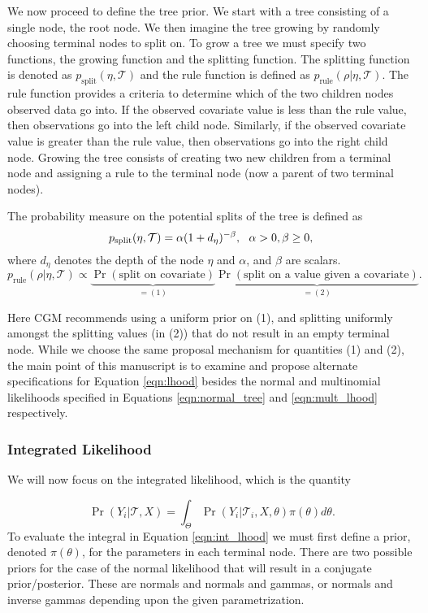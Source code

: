 \documentclass{article}
\begin{document}
We now proceed to define the tree prior. We start with a tree consisting of a single node, the root node. We then imagine the tree growing by randomly choosing terminal nodes to split on. To grow a tree we must specify two functions, the growing function and the splitting function.  The splitting function is denoted as $p_{\text{split}}(\eta, \mathcal{T})$ and the rule function is defined as $p_{\text{rule}}(\rho \vert \eta, \mathcal{T})$. The rule function provides a criteria to determine which of the two children nodes observed data go into. If the observed covariate value is less than the rule value, then observations go into the left child node. Similarly, if the observed covariate value is greater than the rule value, then observations go into the right child node. Growing the tree consists of creating two new children from a terminal node and assigning a rule to the terminal node (now a parent of two terminal nodes). 

The probability measure on the potential splits of the tree is defined as
\begin{equation}\label{eqn:psplit}
p_{\text{split}}(\eta, \mathcal{T})=\alpha(1+d_{\eta})^{-\beta}, \ \ \alpha>0, \beta\geq 0,\\
\end{equation}
where $d_{\eta}$ denotes the depth of the node $\eta$ and $\alpha$, and $\beta$ are scalars. 
\begin{equation}\label{eqn:prule}
p_{\text{rule}}(\rho \vert \eta, \mathcal{T}) \propto \underbrace{\Pr(\text{split on covariate})}_{=(1)}\underbrace{\Pr(\text{split on a value given a covariate})}_{=(2)}. 
\end{equation}

Here CGM recommends using a uniform prior on (1), and splitting uniformly amongst the splitting values (in (2)) that do not result in an empty terminal node. While we choose the same proposal mechanism for quantities (1) and  (2), the main point of this manuscript is to examine and propose alternate specifications for Equation \ref{eqn:lhood} besides the normal and multinomial likelihoods specified in Equations \ref{eqn:normal_tree} and \ref{eqn:mult_lhood} respectively. 

\subsubsection{Integrated Likelihood}
We will now focus on the integrated likelihood, which is the quantity 

\begin{equation}\label{eqn:int_lhood}
\Pr(Y_i \vert \mathcal{T}, X) = \int_{\Theta}\Pr(Y_i \vert \mathcal{T}_i, X, \theta)\pi(\theta)d\theta.
\end{equation}
To evaluate the integral in Equation \ref{eqn:int_lhood} we must first define a prior, denoted $\pi(\theta)$, for the parameters in each terminal node. 
There are two possible priors for the case of the normal likelihood that will result in a conjugate prior/posterior. These are normals and normals and gammas, or normals and inverse gammas depending upon the given parametrization. 
\end{document}
